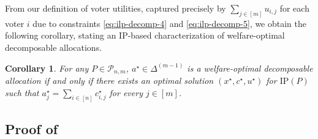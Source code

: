 \documentclass[11pt]{article}
\newtheorem{corollary}{Corollary}
\begin{document}
From our definition of voter utilities, captured precisely by $\sum_{j\in [m]}u_{i,j}$ for each voter $i$ due to constraints \eqref{eq:ilp-decomp-4} and \eqref{eq:ilp-decomp-5}, we obtain the following corollary, stating an IP-based characterization of welfare-optimal decomposable allocations.
\begin{corollary}
    For any $P\in \mathcal{P}_{n,m}$, $a^\star\in \Delta^{(m-1)}$ is a welfare-optimal decomposable allocation if and only if there exists an optimal solution $(x^\star,c^\star,u^\star)$ for $\mathrm{IP}(P)$ such that $a^\star_j=\sum_{i\in [n]} c^\star_{i,j}$ for every $j\in [m]$.
\end{corollary}

    
    
    

\subsection{Proof of }\label{app:thmNPcomplete}

\thmNPcomplete*
\end{document}
